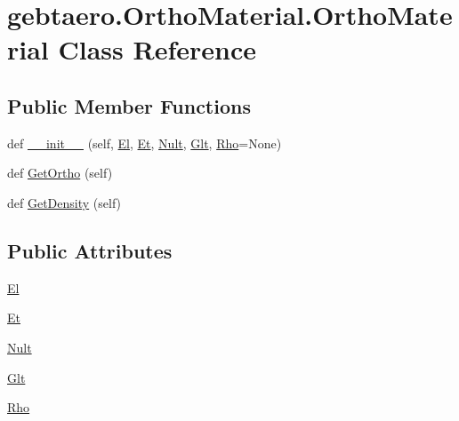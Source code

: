 \hypertarget{classgebtaero_1_1_ortho_material_1_1_ortho_material}{}\section{gebtaero.\+Ortho\+Material.\+Ortho\+Material Class Reference}
\label{classgebtaero_1_1_ortho_material_1_1_ortho_material}
\subsection*{Public Member Functions}
\begin{DoxyCompactItemize}
\item 
def \hyperlink{classgebtaero_1_1_ortho_material_1_1_ortho_material_a373dc6b920e8cebeb15f2ba465094c5e}{\+\_\+\+\_\+init\+\_\+\+\_\+} (self, \hyperlink{classgebtaero_1_1_ortho_material_1_1_ortho_material_a06886fe27a343441b7c49bf57ada36c2}{El}, \hyperlink{classgebtaero_1_1_ortho_material_1_1_ortho_material_a7c51660a08aa851b73bba6a7e0457be8}{Et}, \hyperlink{classgebtaero_1_1_ortho_material_1_1_ortho_material_adcae0796a5742c9467e24fe7370e6c32}{Nult}, \hyperlink{classgebtaero_1_1_ortho_material_1_1_ortho_material_a0caf3d15efa1fef5bafed6e6c8d7a5b3}{Glt}, \hyperlink{classgebtaero_1_1_ortho_material_1_1_ortho_material_aa1fa00a17cf09210c0daf5d7bbd07d0d}{Rho}=None)
\item 
def \hyperlink{classgebtaero_1_1_ortho_material_1_1_ortho_material_a281c7c6ffe7db16e3a27c7bfb5b14e3a}{Get\+Ortho} (self)
\item 
def \hyperlink{classgebtaero_1_1_ortho_material_1_1_ortho_material_a803f61a2e841734af169ac4ad4895605}{Get\+Density} (self)
\end{DoxyCompactItemize}
\subsection*{Public Attributes}
\begin{DoxyCompactItemize}
\item 
\hyperlink{classgebtaero_1_1_ortho_material_1_1_ortho_material_a06886fe27a343441b7c49bf57ada36c2}{El}
\item 
\hyperlink{classgebtaero_1_1_ortho_material_1_1_ortho_material_a7c51660a08aa851b73bba6a7e0457be8}{Et}
\item 
\hyperlink{classgebtaero_1_1_ortho_material_1_1_ortho_material_adcae0796a5742c9467e24fe7370e6c32}{Nult}
\item 
\hyperlink{classgebtaero_1_1_ortho_material_1_1_ortho_material_a0caf3d15efa1fef5bafed6e6c8d7a5b3}{Glt}
\item 
\hyperlink{classgebtaero_1_1_ortho_material_1_1_ortho_material_aa1fa00a17cf09210c0daf5d7bbd07d0d}{Rho}
\end{DoxyCompactItemize}



